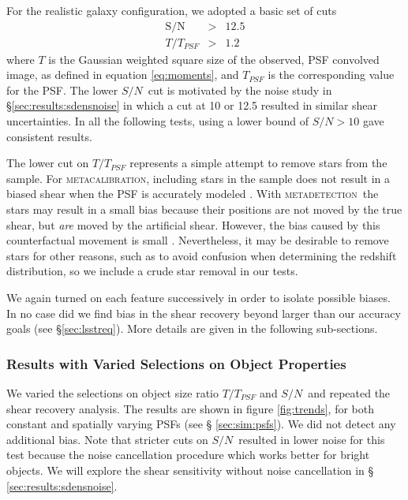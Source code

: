 \documentclass[twocolumn,twocolappendix,astrosym]{openjournal}
\newcommand{\snr}{$S/N$}
\newcommand{\mcal}{\textsc{metacalibration}}
\newcommand{\mdet}{\textsc{metadetection}}
\begin{document}
For the realistic galaxy configuration, we adopted a basic set of cuts
\begin{eqnarray} \label{eq:basiccuts}
    \mathrm{S/N} & > & 12.5 \\
    T/T_{PSF} & > & 1.2
\end{eqnarray}
where $T$ is the Gaussian weighted square size of the observed, PSF convolved
image, as defined in equation \ref{eq:moments}, and $T_{PSF}$ is the
corresponding value for the PSF.  The lower \snr\ cut is motivated by the noise
study in \S \ref{sec:results:sdensnoise} in which a cut at 10 or 12.5 resulted
in similar shear uncertainties.  In all the following tests, using a lower
bound of $S/N > 10$ gave consistent results.

The lower cut on $T/T_{PSF}$ represents a simple attempt to remove stars from
the sample.  For \mcal, including stars in the sample does not result in a
biased shear when the PSF is accurately modeled \citep{SheldonMcal2017}.  With
\mdet\ the stars may result in a small bias because their positions are not
moved by the true shear, but {\it are} moved by the artificial shear. However,
the bias caused by this counterfactual movement is small \citep{mdet20}.
Nevertheless, it may be desirable to remove stars for other reasons, such as to
avoid confusion when determining the redshift distribution, so we include a
crude star removal in our tests.

We again turned on each feature successively in order to isolate possible
biases.  In no case did we find bias in the shear recovery beyond larger than
our accuracy goals (see \S \ref{sec:lsstreq}).  More details are given in the
following sub-sections.

\subsubsection{Results with Varied Selections on Object Properties} \label{sec:results:select}

We varied the selections on object size ratio $T/T_{PSF}$ and \snr\ and
repeated the shear recovery analysis.  The results are shown in figure
\ref{fig:trends}, for both constant and spatially varying PSFs (see \S
\ref{sec:sim:psfs}).  We did not detect any additional bias.  Note that
stricter cuts on \snr\ resulted in lower noise for this test because the noise
cancellation procedure which works better for bright objects.  We will explore
the shear sensitivity without noise cancellation in \S
\ref{sec:results:sdensnoise}.
\end{document}
